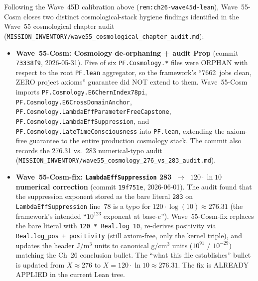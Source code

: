 \begin{remark}\label{rem:ch26-wave55-cosm-lean}
Following the Wave~45D calibration above (\texttt{rem:ch26-wave45d-lean}), Wave~55-Cosm closes two distinct cosmological-stack hygiene findings identified in the Wave~55 cosmological chapter audit (\texttt{MISSION\_INVENTORY/wave55\_cosmological\_chapter\_audit.md}):
\begin{itemize}
  \item \textbf{Wave~55-Cosm: Cosmology de-orphaning + audit Prop} (commit \texttt{73338f9}, 2026-05-31). Five of six \texttt{PF.Cosmology.*} files were ORPHAN with respect to the root \texttt{PF.lean} aggregator, so the framework's ``7662~jobs clean, ZERO project axioms'' guarantee did NOT extend to them. Wave~55-Cosm imports \texttt{PF.Cosmology.E6ChernIndex78pi}, \texttt{PF.Cosmology.E6CrossDomainAnchor}, \texttt{PF.Cosmology.LambdaEffParameterFreeCapstone}, \texttt{PF.Cosmology.LambdaEffSuppression}, and \texttt{PF.Cosmology.LateTimeConsciousness} into \texttt{PF.lean}, extending the axiom-free guarantee to the entire production cosmology stack. The commit also records the 276.31 vs.\ 283 numerical-typo audit (\texttt{MISSION\_INVENTORY/wave55\_cosmology\_276\_vs\_283\_audit.md}).
  \item \textbf{Wave~55-Cosm-fix: \texttt{LambdaEffSuppression} 283~$\to$~$120\cdot \ln 10$ numerical correction} (commit \texttt{19f751e}, 2026-06-01). The audit found that the suppression exponent stored as the bare literal \texttt{283} on \texttt{LambdaEffSuppression} line~78 is a typo for $120 \cdot \log(10) \approx 276.31$ (the framework's intended ``$10^{123}$ exponent at base-$e$''). Wave~55-Cosm-fix replaces the bare literal with \texttt{120 * Real.log 10}, re-derives positivity via \texttt{Real.log\_pos + positivity} (still axiom-free, only the kernel triple), and updates the header J/m$^3$ units to canonical g/cm$^3$ units ($10^{91}$ / $10^{-29}$) matching the Ch~26 conclusion bullet. The ``what this file establishes'' bullet is updated from $X \approx 276$ to $X = 120 \cdot \ln 10 \approx 276.31$. The fix is ALREADY APPLIED in the current Lean tree.

\end{itemize}
\end{remark}
